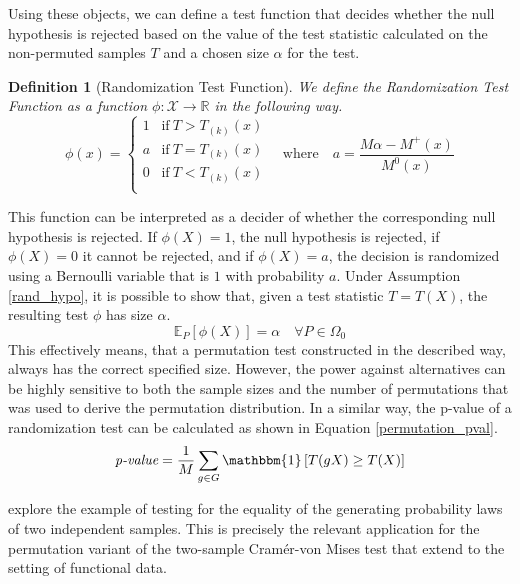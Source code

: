 \documentclass[12pt, a4paper]{article}
\theoremstyle{MAstyle} \newtheorem{assumption}{Assumption}[section]
\theoremstyle{MAstyle} \newtheorem{definition}{Definition}[section]
\theoremstyle{MAstyle} \newtheorem{theorem}{Theorem}[section]
\begin{document}
			Using these objects, we can define a test function that decides whether the null hypothesis is rejected based on the value of the test statistic calculated on the non-permuted samples $T$ and a chosen size $\alpha$ for the test.
			\begin{definition}[Randomization Test Function]\label{RandTestFunc}
				We define the Randomization Test Function as a function $\phi: \mathcal{X} \rightarrow \mathbb{R}$ in the following way.
					\begin{equation*}
						\phi(x) = \begin{cases}
							1 &\text{if} \ T > T_{(k)}(x) \\
							a &\text{if} \ T = T_{(k)}(x) \\
							0 &\text{if} \ T < T_{(k)}(x) \\
						\end{cases} \quad \text{where} \quad
						a = \frac{M\alpha - M^{+}(x)}{M^{0}(x)}
					\end{equation*}
				
			\end{definition}
			This function can be interpreted as a decider of whether the corresponding null hypothesis is rejected. If $\phi(X) = 1$, the null hypothesis is rejected, if $\phi(X) = 0$ it cannot be rejected, and if $\phi(X) = a$, the decision is randomized using a Bernoulli variable that is $1$ with probability $a$. 
			Under Assumption \ref{rand_hypo}, it is possible to show that, given a test statistic $T = T(X)$, the resulting test $\phi$ has size $\alpha$.
			\begin{equation}
				\mathbb{E}_{P}\left[\phi(X)\right] = \alpha \quad \forall P \in \Omega_0
			\end{equation}
			This effectively means, that a permutation test constructed in the described way, always has the correct specified size. However, the power against alternatives can be highly sensitive to both the sample sizes and the number of permutations that was used to derive the permutation distribution.	
			In a similar way, the p-value of a randomization test can be calculated as shown in Equation \ref{permutation_pval}.
			\begin{equation}\label{permutation_pval}
				\textit{p-value} = \frac{1}{M} \sum_{g \in G} \mathbbm{1}\left[T(gX) \geq T(X)\right]
			\end{equation}
					
			\cite{lehmann_testing_2005} explore the example of testing for the equality of the generating probability laws of two independent samples. This is precisely the relevant application for the permutation variant of the two-sample Cram\'{e}r-von Mises test that \cite{bugni_permutation_2021} extend to the setting of functional data. \\
			
\end{document}
